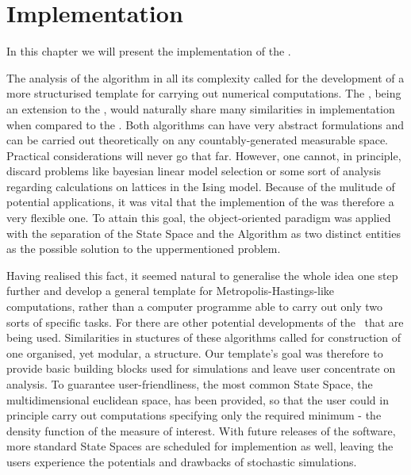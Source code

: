 \chapter{ Implementation }

In this chapter we will present the implementation of the \PT. 

The analysis of the algorithm in all its complexity called for the development of a more structurised template for carrying out numerical computations. The \PT, being an extension to the \MH, would naturally share many similarities in implementation when compared to the \PT. Both algorithms can have very abstract formulations and can be carried out theoretically on any countably-generated measurable space. Practical considerations will never go that far. However, one cannot, in principle, discard problems like bayesian linear model selection or some sort of analysis regarding calculations on lattices in the Ising model. Because of the mulitude of potential applications, it was vital that the implemention of the \PT was therefore a very flexible one. To attain this goal, the object-oriented paradigm was applied with the separation of the State Space and the Algorithm as two distinct entities as the possible solution to the uppermentioned problem. 

Having realised this fact, it seemed natural to generalise the whole idea one step further and develop a general template for Metropolis-Hastings-like computations, rather than a computer programme able to carry out only two sorts of specific tasks. For there are other potential developments of the \MH\, that are being used. Similarities in stuctures of these algorithms called for construction of one organised, yet modular, a structure. Our template's goal was therefore to provide basic building blocks used for simulations and leave user concentrate on analysis. To guarantee user-friendliness, the most common State Space, the multidimensional euclidean space, has been provided, so that the user could in principle carry out computations specifying only the required minimum - the density function of the measure of interest. With future releases of the software, more standard State Spaces are scheduled for implemention as well, leaving the users experience the potentials and drawbacks of stochastic simulations.